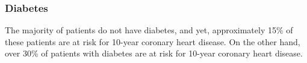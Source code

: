 \documentclass[10pt]{article}
\begin{document}
\begin{figure}[hbt!]
\hspace*{\fill}
\centering
{}\hspace{2em}%
%
\hspace*{\fill}
\end{figure}

\subsubsection*{Diabetes}

The majority of patients do not have diabetes, and yet, approximately 15\% of these patients are at risk for 10-year coronary heart disease. On the other hand, over 30\% of patients with diabetes are at risk for 10-year coronary heart disease.

\begin{figure}[hbt!]
\hspace*{\fill}
\centering
{}\hspace{2em}%
%
\hspace*{\fill}
\end{figure}
\end{document}
